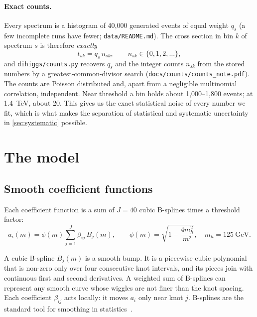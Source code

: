 \documentclass[11pt]{article}
\newcommand{\file}[1]{\nolinkurl{#1}}
\newcommand{\code}[1]{\texttt{#1}}
\begin{document}
\paragraph{Exact counts.} Every spectrum is a histogram of 40,000 generated events of equal
weight $q_s$ (a few incomplete runs have fewer; \file{data/README.md}). The cross section in
bin $k$ of spectrum $s$ is therefore \emph{exactly}
\begin{equation}
  t_{sk} = q_s\, n_{sk}, \qquad n_{sk}\in\{0, 1, 2, \dots\},
\end{equation}
and \code{dihiggs/counts.py} recovers $q_s$ and the integer counts $n_{sk}$ from the stored
numbers by a greatest-common-divisor search (\file{docs/counts/counts_note.pdf}). The counts
are Poisson distributed and, apart from a negligible multinomial correlation, independent.
Near threshold a bin holds about 1,000--1,800 events; at 1.4~TeV, about 20. This gives us
the exact statistical noise of every number we fit, which is what makes the separation of
statistical and systematic uncertainty in \cref{sec:systematic} possible.

\section{The model}
\label{sec:model}

\subsection{Smooth coefficient functions}

Each coefficient function is a sum of $J = 40$ cubic B-splines times a threshold factor:
\begin{equation}
  a_i(m) = \phi(m)\sum_{j=1}^{J}\beta_{ij}\,B_j(m), \qquad
  \phi(m) = \sqrt{1 - \frac{4m_h^2}{m^2}}, \quad m_h = 125~\text{GeV}.
  \label{eq:spline}
\end{equation}

\begin{aside}
A cubic B-spline $B_j(m)$ is a smooth bump. It is a piecewise cubic polynomial that is
non-zero only over four consecutive knot intervals, and its pieces join with continuous first
and second derivatives. A weighted sum of B-splines can represent any smooth curve whose
wiggles are not finer than the knot spacing. Each coefficient $\beta_{ij}$ acts locally: it
moves $a_i$ only near knot $j$. B-splines are the standard tool for smoothing in
statistics~\cite{deboor,eilers}.
\end{aside}
\end{document}
